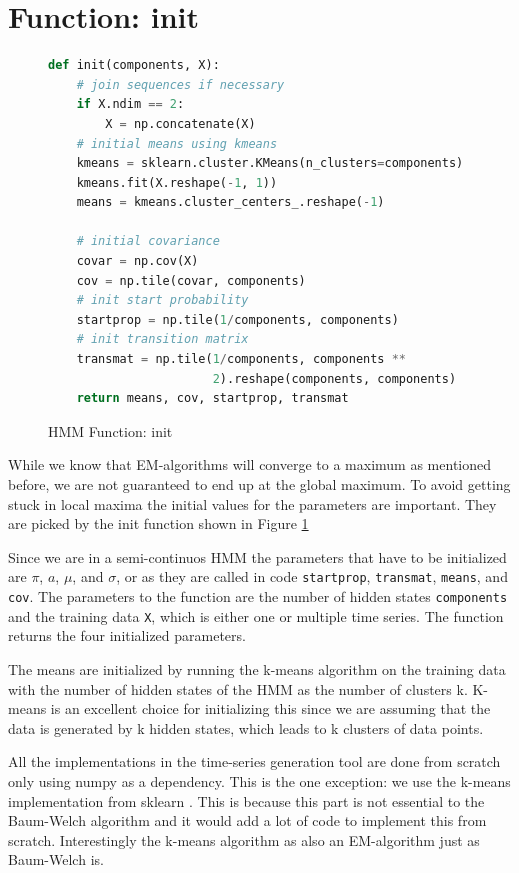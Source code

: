 \section{Function: init}

\begin{figure}
\begin{singlespace}
\begin{lstlisting}[language=Python]
def init(components, X):
    # join sequences if necessary
    if X.ndim == 2:
        X = np.concatenate(X)
    # initial means using kmeans
    kmeans = sklearn.cluster.KMeans(n_clusters=components)
    kmeans.fit(X.reshape(-1, 1))
    means = kmeans.cluster_centers_.reshape(-1)

    # initial covariance
    covar = np.cov(X)
    cov = np.tile(covar, components)
    # init start probability
    startprop = np.tile(1/components, components)
    # init transition matrix
    transmat = np.tile(1/components, components **
                       2).reshape(components, components)
    return means, cov, startprop, transmat
\end{lstlisting}
\end{singlespace}
   
\caption{HMM Function: init}    
\label{fig:hmm-init-listing}
\end{figure}

While we know that EM-algorithms will converge to a maximum as mentioned before, we are not guaranteed to end up at the global maximum. To avoid getting stuck in local maxima the initial values for the parameters are important. They are picked by the init function shown in Figure \ref{fig:hmm-init-listing}

Since we are in a semi-continuos HMM the parameters that have to be initialized are $\pi$, $a$, $\mu$, and $\sigma$, or as they are called in code \texttt{startprop}, \texttt{transmat}, \texttt{means}, and \texttt{cov}. The parameters to the function are the number of hidden states \texttt{components} and the training data \texttt{X}, which is either one or multiple time series. The function returns the four initialized parameters. 

The means are initialized by running the k-means algorithm on the training data with the number of hidden states of the HMM as the number of clusters k. K-means is an excellent choice for initializing this since we are assuming that the data is generated by k hidden states, which leads to k clusters of data points. 

All the implementations in the time-series generation tool are done from scratch only using numpy as a dependency. This is the one exception: we use the k-means implementation from sklearn \parencite{pedregosa2011scikit}.  This is because this part is not essential to the Baum-Welch algorithm and it would add a lot of code to implement this from scratch. Interestingly the k-means algorithm as also an EM-algorithm just as Baum-Welch is. 

